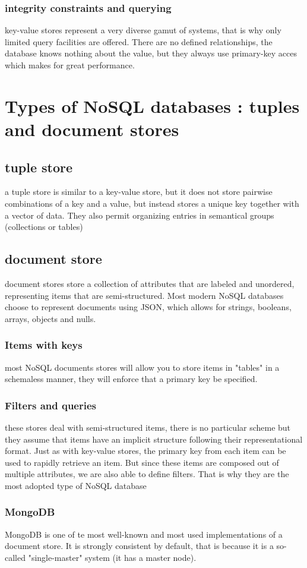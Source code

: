 \documentclass{report}
\begin{document}
			\subsection{integrity constraints and querying}
				key-value stores represent a very diverse gamut of systems, that is why only limited query facilities are offered. There are no defined relationships, the database knows nothing about the value, but they always use primary-key acces which makes for great performance. 
	\chapter{Types of NoSQL databases : tuples and document stores}
		\section{tuple store}
			a tuple store is similar to a key-value store, but it does not store pairwise combinations of a key and a value, but instead stores a unique key together with a vector of data. They also permit organizing entries in semantical groups (collections or tables)
		\section{document store}
			document stores store a collection of attributes that are labeled and unordered, representing items that are semi-structured.
			Most modern NoSQL databases choose to represent documents using JSON, which allows for strings, booleans, arrays, objects and nulls.
			\subsection{Items with keys}
				most NoSQL documents stores will allow you to store items in "tables" in a schemaless manner, they will enforce that a primary key be specified.
			\subsection{Filters and queries}
				these stores deal with semi-structured items, there is no particular scheme but they assume that items have an implicit structure following their representational format. Just as with key-value stores, the primary key from each item can be used to rapidly retrieve an item. But since these items are composed out of multiple attributes, we are also able to define filters. That is why they are the most adopted type of NoSQL database
			\subsection{MongoDB}
				MongoDB is one of te most well-known and most used implementations of a document store. It is strongly consistent by default, that is because it is a so-called "single-master" system (it has a master node).
\end{document}
